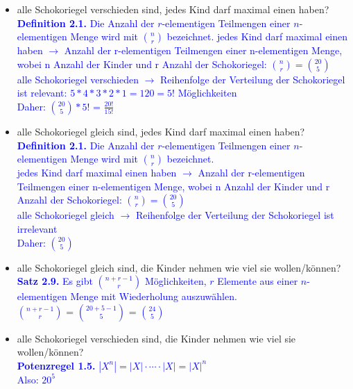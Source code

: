 \documentclass{article} %
\begin{document}
\begin{itemize}
    \item alle Schokoriegel verschieden sind, jedes Kind darf maximal einen haben? \\ 
    \textcolor{blue}{\textbf{Definition 2.1.} Die Anzahl der $r$-elementigen Teilmengen einer $n$-elementigen Menge wird mit $\binom{n}{r}$ bezeichnet.
} \newline
    \textcolor{blue}{jedes Kind darf maximal einen haben $\rightarrow$ Anzahl der r-elementigen Teilmengen einer n-elementigen Menge, wobei n Anzahl der Kinder und r Anzahl der Schokoriegel: $\binom{n}{r} = \binom{20}{5}$ } \\
\textcolor{blue}{alle Schokoriegel verschieden $\rightarrow$ Reihenfolge der Verteilung der Schokoriegel ist relevant: $5*4*3*2*1 = 120 = 5!$ Möglichkeiten } \\
    \textcolor{blue}{Daher: $\binom{20}{5}  * 5!$ = $\frac{20!}{15!}$ }
 \item alle Schokoriegel gleich sind, jedes Kind darf maximal einen haben? \\
 \textcolor{blue}{\textbf{Definition 2.1.} Die Anzahl der $r$-elementigen Teilmengen einer $n$-elementigen Menge wird mit $\binom{n}{r}$ bezeichnet.
} \\
 \textcolor{blue}{jedes Kind darf maximal einen haben $\rightarrow$ Anzahl der r-elementigen Teilmengen einer n-elementigen Menge, wobei n Anzahl der Kinder und r Anzahl der Schokoriegel: $\binom{n}{r} = \binom{20}{5}$ } \\
\textcolor{blue}{alle Schokoriegel gleich $\rightarrow$ Reihenfolge der Verteilung der Schokoriegel ist irrelevant } \\
    \textcolor{blue}{Daher: $\binom{20}{5}$ }
 \item alle Schokoriegel gleich sind, die Kinder nehmen wie viel sie wollen/können? \\
 \textcolor{blue}{\textbf{Satz 2.9.} Es gibt $\binom{n+r-1}{r}$ Möglichkeiten, $r$ Elemente aus einer $n$-elementigen Menge mit Wiederholung auszuwählen.
}\\ 
\textcolor{blue}{$\binom{n+r-1}{r}$ = $\binom{20+5-1}{5}$ = $\binom{24}{5}$}
 \item alle Schokoriegel verschieden sind, die Kinder nehmen wie viel sie wollen/können? \\
 \textcolor{blue}{\textbf{Potenzregel 1.5.} \quad $|X^n| = |X| \cdot \cdots \cdot |X| = |X|^n$
} \\
\textcolor{blue}{Also: $20^5$}
\end{itemize}
\end{document}
